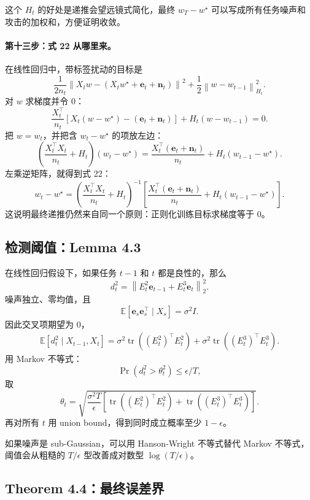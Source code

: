 \documentclass[UTF8,fontset=none,11pt]{ctexart}
\theoremstyle{cnstyle}
\newcommand{\E}{\mathbb{E}}
\newcommand{\tr}{\operatorname{tr}}
\newcommand{\norm}[1]{\left\lVert #1\right\rVert}
\begin{document}
这个 \(H_t\) 的好处是递推会望远镜式简化，最终 \(w_T-w^\star\) 可以写成所有任务噪声和攻击的加权和，方便证明收敛。

\paragraph{第十三步：式 22 从哪里来。}
在线性回归中，带标签扰动的目标是
\[
  \frac1{2n_t}\norm{X_tw-(X_tw^\star+\mathbf e_t+\mathbf n_t)}^2
  +\frac12\norm{w-w_{t-1}}_{H_t}^2.
\]
对 \(w\) 求梯度并令 0：
\[
  \frac{X_t^\top}{n_t}
  \left[
  X_t(w-w^\star)-(\mathbf e_t+\mathbf n_t)
  \right]
  +H_t(w-w_{t-1})=0.
\]
把 \(w=w_t\)，并把含 \(w_t-w^\star\) 的项放左边：
\[
  \left(
  \frac{X_t^\top X_t}{n_t}+H_t
  \right)(w_t-w^\star)
  =
  \frac{X_t^\top(\mathbf e_t+\mathbf n_t)}{n_t}
  +H_t(w_{t-1}-w^\star).
\]
左乘逆矩阵，就得到式 22：
\[
  w_t-w^\star
  =
  \left(
  \frac{X_t^\top X_t}{n_t}+H_t
  \right)^{-1}
  \left[
  \frac{X_t^\top(\mathbf e_t+\mathbf n_t)}{n_t}
  +H_t(w_{t-1}-w^\star)
  \right].
\]
这说明最终递推仍然来自同一个原则：正则化训练目标求梯度等于 0。

\subsection{检测阈值：Lemma 4.3}

在线性回归假设下，如果任务 \(t-1\) 和 \(t\) 都是良性的，那么
\[
  d_t^2
  =
  \norm{E_t^2\mathbf e_{t-1}+E_t^3\mathbf e_t}_2^2 .
\]
噪声独立、零均值，且
\[
  \E[\mathbf e_s\mathbf e_s^\top\mid X_s]=\sigma^2I .
\]
因此交叉项期望为 0，
\begin{align}
  \E[d_t^2\mid X_{t-1},X_t]
  =
  \sigma^2\tr((E_t^2)^\top E_t^2)
  +
  \sigma^2\tr((E_t^3)^\top E_t^3).
  \label{eq:dt-expectation}
\end{align}
用 Markov 不等式：
\[
  \Pr(d_t^2>\theta_t^2)\le\epsilon/T,
\]
取
\begin{equation}
  \theta_t
  =
  \sqrt{
  \frac{\sigma^2T}{\epsilon}
  \left[
  \tr((E_t^2)^\top E_t^2)
  +
  \tr((E_t^3)^\top E_t^3)
  \right]
  }.
  \label{eq:theta}
\end{equation}
再对所有 \(t\) 用 union bound，得到同时成立概率至少 \(1-\epsilon\)。

如果噪声是 sub-Gaussian，可以用 Hanson-Wright 不等式替代 Markov 不等式，
阈值会从粗糙的 \(T/\epsilon\) 型改善成对数型 \(\log(T/\epsilon)\)。

\subsection{Theorem 4.4：最终误差界}
\end{document}
